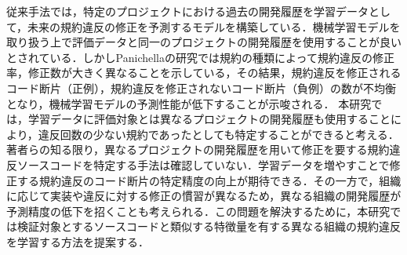 \documentclass[T,J]{fose} %
\begin{document}


従来手法では，特定のプロジェクトにおける過去の開発履歴を学習データとして，未来の規約違反の修正を予測するモデルを構築している．機械学習モデルを取り扱う上で評価データと同一のプロジェクトの開発履歴を使用することが良いとされている．しかしPanichellaの研究では規約の種類によって規約違反の修正率，修正数が大きく異なることを示している\cite{}，その結果，規約違反を修正されるコード断片（正例），規約違反を修正されないコード断片（負例）の数が不均衡となり，機械学習モデルの予測性能が低下することが示唆される．
本研究では，学習データに評価対象とは異なるプロジェクトの開発履歴も使用することにより，違反回数の少ない規約であったとしても特定することができると考える．著者らの知る限り，異なるプロジェクトの開発履歴を用いて修正を要する規約違反ソースコードを特定する手法は確認していない．学習データを増やすことで修正する規約違反のコード断片の特定精度の向上が期待できる．その一方で，組織に応じて実装や違反に対する修正の慣習が異なるため，異なる組織の開発履歴が予測精度の低下を招くことも考えられる．この問題を解決するために，本研究では検証対象とするソースコードと類似する特徴量を有する異なる組織の規約違反を学習する方法を提案する．




\end{document}
